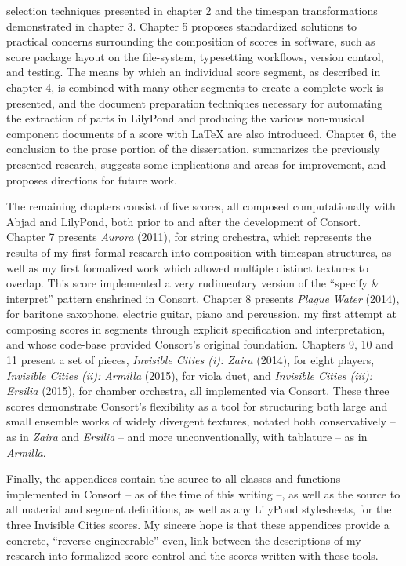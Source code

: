 selection techniques presented in chapter 2 and the timespan transformations
demonstrated in chapter 3. Chapter 5 proposes standardized solutions to
practical concerns surrounding the composition of scores in software, such as
score package layout on the file-system, typesetting workflows, version
control, and testing. The means by which an individual score segment, as
described in chapter 4, is combined with many other segments to create a
complete work is presented, and the document preparation techniques necessary
for automating the extraction of parts in LilyPond and producing the various
non-musical component documents of a score with \LaTeX{} are also introduced.
Chapter 6, the conclusion to the prose portion of the dissertation, summarizes
the previously presented research, suggests some implications and areas for
improvement, and proposes directions for future work.

The remaining chapters consist of five scores, all composed computationally
with Abjad and LilyPond, both prior to and after the development of Consort.
Chapter 7 presents \emph{Aurora} (2011), for string orchestra, which represents
the results of my first formal research into composition with timespan
structures, as well as my first formalized work which allowed multiple distinct
textures to overlap. This score implemented a very rudimentary version of the
\enquote{specify \& interpret} pattern enshrined in Consort. Chapter 8 presents
\emph{Plague Water} (2014), for baritone saxophone, electric guitar, piano and
percussion, my first attempt at composing scores in segments through explicit
specification and interpretation, and whose code-base provided Consort's
original foundation. Chapters 9, 10 and 11 present a set of pieces,
\emph{Invisible Cities (i): Zaira} (2014), for eight players, \emph{Invisible
Cities (ii): Armilla} (2015), for viola duet, and \emph{Invisible Cities (iii):
Ersilia} (2015), for chamber orchestra, all implemented via Consort. These
three scores demonstrate Consort's flexibility as a tool for structuring both
large and small ensemble works of widely divergent textures, notated both
conservatively -- as in \emph{Zaira} and \emph{Ersilia} -- and more
unconventionally, with tablature -- as in \emph{Armilla}.

Finally, the appendices contain the source to all classes and functions
implemented in Consort -- as of the time of this writing --, as well as the
source to all material and segment definitions, as well as any LilyPond
stylesheets, for the three Invisible Cities scores. My sincere hope is that
these appendices provide a concrete, \enquote{reverse-engineerable} even, link
between the descriptions of my research into formalized score control and the
scores written with these tools.